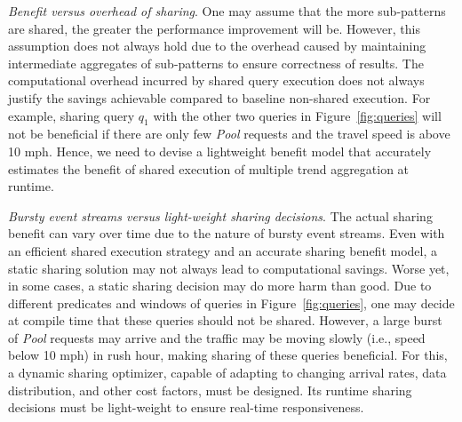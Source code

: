 \textit{Benefit versus overhead of sharing}.
One may assume that the more sub-patterns are shared, the greater the performance improvement will be. However, this assumption does not always hold due to the overhead caused by maintaining intermediate aggregates of sub-patterns to ensure correctness of results. The computational overhead incurred by  shared query execution does not always justify the savings achievable compared to  baseline non-shared execution.
%
For example, sharing query $q_1$ with the other two queries in Figure~\ref{fig:queries} will not be beneficial if there are only few \textit{Pool} requests and the travel speed is above 10 mph.
%
Hence, we need to devise a lightweight benefit model that accurately estimates the benefit of shared execution of multiple trend aggregation  at runtime.

\textit{Bursty event streams versus light-weight sharing decisions}.
The actual sharing benefit can vary over time due to the nature of bursty event streams. Even with an efficient shared execution strategy and an accurate sharing benefit model, a static sharing solution may not always lead to computational savings. Worse yet, 
in some cases,  a static sharing decision may do more harm than good. 
%
Due to different predicates and windows of queries in Figure~\ref{fig:queries}, one may decide at compile time that these queries should not be shared. However, a large burst of \textit{Pool} requests may arrive and the traffic may be moving slowly (i.e., speed below 10 mph) in rush hour, making sharing of these queries beneficial.
For this, a dynamic sharing optimizer, capable of adapting to changing arrival rates, data distribution, and other cost factors, must be designed. Its runtime sharing decisions must be light-weight to ensure real-time responsiveness.



\vspace*{-5mm}

